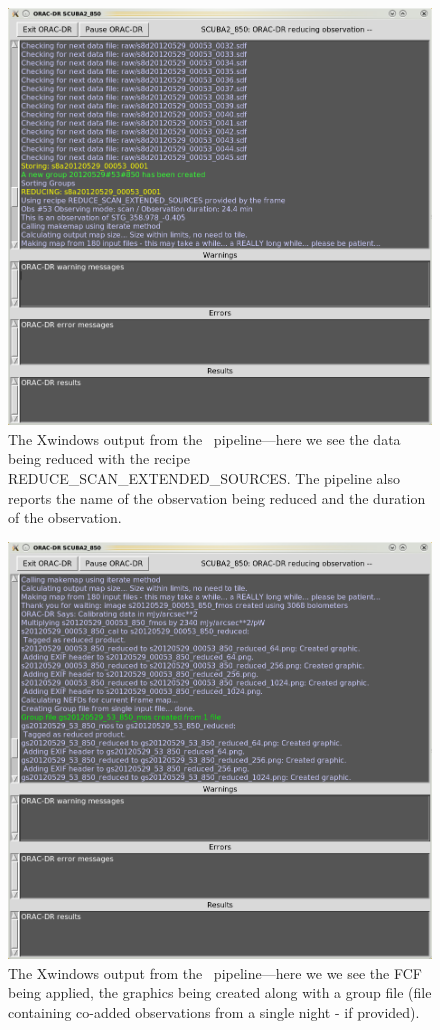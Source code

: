 \begin{figure}
\begin{center}
\includegraphics[width=0.7\linewidth]{sc21-pipeline-oracdr-2}
\caption[Output from the pipeline]{The Xwindows output from the \oracdr\
pipeline---here we see the data being reduced with the recipe
REDUCE\_SCAN\_EXTENDED\_SOURCES. The pipeline also reports the name of the
observation being reduced and the duration of the observation. \label{pipeline-oracdr-2}}
\end{center}
\end{figure}

\begin{figure}
\begin{center}
\includegraphics[width=0.7\linewidth]{sc21-pipeline-oracdr-3}
\caption[Output from the pipeline]{The Xwindows output from the \oracdr\
pipeline---here we we see the FCF being applied, the graphics
being created along with a group file (file containing co-added observations
from a single night - if provided). \label{pipeline-oracdr-3}}
\end{center}
\end{figure}


